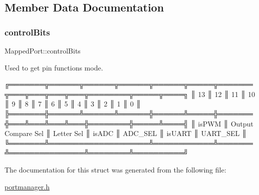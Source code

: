 \subsection{Member Data Documentation}
\mbox{\label{structMappedPort_ae73f042b9d9a8a1a87d489525a2ca947}} 
\subsubsection{\texorpdfstring{controlBits}{controlBits}}
{\footnotesize\ttfamily Mapped\+Port\+::control\+Bits}



Used to get pin functions mode. 

\begin{DoxyVerb}╔═══════╦══════╦══════╦══════╦══════╦═════╦═══════╦═══╦═══╦═══╦═══╦════════╦═════╦════╗
║ 13    ║ 12   ║ 11   ║ 10   ║ 9    ║ 8   ║ 7     ║ 6 ║ 5 ║ 4 ║ 3 ║ 2      ║ 1   ║ 0  ║
╠═══════╬══════╩══════╩══════╬══════╩═════╬═══════╬═══╩═══╩═══╩═══╬════════╬═════╩════╣
║ isPWM ║ Output Compare Sel ║ Letter Sel ║ isADC ║ ADC_SEL       ║ isUART ║ UART_SEL ║
╚═══════╩════════════════════╩════════════╩═══════╩═══════════════╩════════╩══════════╝
\end{DoxyVerb}
 

The documentation for this struct was generated from the following file\+:\begin{DoxyCompactItemize}
\item 
\mbox{\hyperlink{portmanager_8h}{portmanager.\+h}}\end{DoxyCompactItemize}
